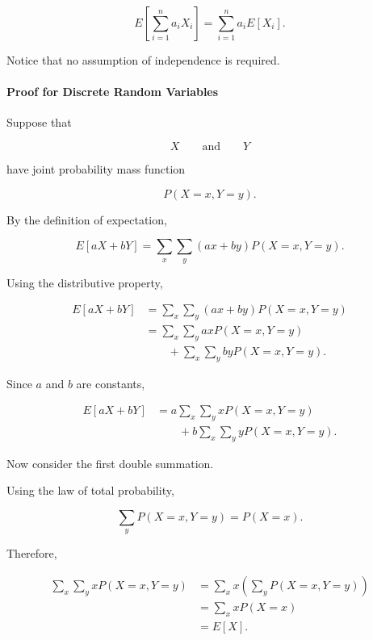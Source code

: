 \documentclass[11pt]{article}
\begin{document}
\begin{mdframed}[
		linewidth=0.8pt,
		roundcorner=6pt,
		backgroundcolor=gray!5,
		linecolor=gray!60,
		innertopmargin=10pt,
		innerbottommargin=10pt,
		innerleftmargin=10pt,
		innerrightmargin=10pt
		]
		\[
		\boxed{
			E\!\left[
			\sum_{i=1}^{n}a_iX_i
			\right]
			=
			\sum_{i=1}^{n}
			a_iE[X_i].
		}
		\]
		
		Notice that no assumption of independence is required.
		
		\bigskip
		
		\paragraph{Proof for Discrete Random Variables}
		
		Suppose that
		
		\[
		X \qquad \text{and} \qquad Y
		\]
	
		
		have joint probability mass function
		
		\[
		P(X=x,Y=y).
		\]
		
		By the definition of expectation,
		
		\[
		E[aX+bY]
		=
		\sum_x
		\sum_y
		(a x+b y)
		P(X=x,Y=y).
		\]
		
		Using the distributive property,
		
		\[
		\begin{aligned}
			E[aX+bY]
			&=
			\sum_x
			\sum_y
			\left(
			ax+by
			\right)
			P(X=x,Y=y)
			\\[0.3cm]
			&=
			\sum_x
			\sum_y
			axP(X=x,Y=y)
			\\
			&\qquad
			+
			\sum_x
			\sum_y
			byP(X=x,Y=y).
		\end{aligned}
		\]
		
		Since \(a\) and \(b\) are constants,
		
		\[
		\begin{aligned}
			E[aX+bY]
			&=
			a
			\sum_x
			\sum_y
			xP(X=x,Y=y)
			\\
			&\qquad
			+
			b
			\sum_x
			\sum_y
			yP(X=x,Y=y).
		\end{aligned}
		\]
		
		Now consider the first double summation.
		
		Using the law of total probability,
		
		\[
		\sum_y
		P(X=x,Y=y)
		=
		P(X=x).
		\]
		
		Therefore,
		
		\[
		\begin{aligned}
			\sum_x
			\sum_y
			xP(X=x,Y=y)
			&=
			\sum_x
			x
			\left(
			\sum_y
			P(X=x,Y=y)
			\right)
			\\[0.3cm]
			&=
			\sum_x
			xP(X=x)
			\\[0.3cm]
			&=
			E[X].
		\end{aligned}
		\]
		

\end{mdframed}
\end{document}
